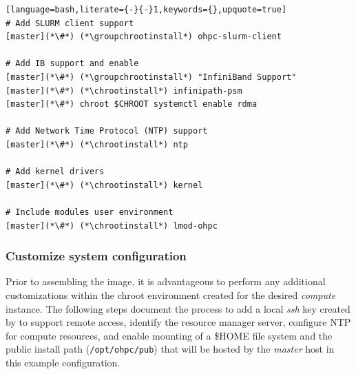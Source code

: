 \documentclass[letterpaper]{article}
\newcommand{\chrootinstall}{yum -y --installroot=\$CHROOT install}
\newcommand{\groupchrootinstall}{yum -y --installroot=\$CHROOT groupinstall}
\begin{document}
\begin{lstlisting}[language=bash,literate={-}{-}1,keywords={},upquote=true]
# Add SLURM client support
[master](*\#*) (*\groupchrootinstall*) ohpc-slurm-client

# Add IB support and enable
[master](*\#*) (*\groupchrootinstall*) "InfiniBand Support"
[master](*\#*) (*\chrootinstall*) infinipath-psm
[master](*\#*) chroot $CHROOT systemctl enable rdma

# Add Network Time Protocol (NTP) support
[master](*\#*) (*\chrootinstall*) ntp

# Add kernel drivers
[master](*\#*) (*\chrootinstall*) kernel

# Include modules user environment
[master](*\#*) (*\chrootinstall*) lmod-ohpc
\end{lstlisting}

\subsubsection{Customize system configuration} \label{sec:master_customization}

Prior to assembling the image, it is advantageous to perform any additional
customizations within the chroot environment created for the desired {\em
  compute} instance. The following steps document the process to add a local
{\em ssh} key created by \Warewulf{} to support remote access, identify the
resource manager server, configure NTP for compute resources, and enable \NFS{}
mounting of a \$HOME file system and the public \OHPC{} install path
(\texttt{/opt/ohpc/pub}) that will be hosted by the {\em master} host in this
example configuration.  
\end{document}
